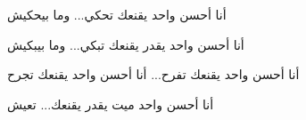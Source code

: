 \documentclass[9.3pt]{extarticle} %
\begin{document}
\begin{Arabic}
أنا أحسن واحد يقنعك تحكي... وما بيحكيش

أنا أحسن واحد يقدر يقنعك تبكي... وما بيبكيش

أنا أحسن واحد يقنعك تفرح... أنا أحسن واحد يقنعك تجرح

أنا أحسن واحد ميت يقدر يقنعك... تعيش
\end{Arabic}
\end{document}
